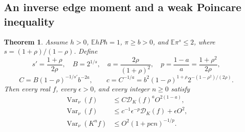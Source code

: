 \documentclass[11pt]{article}
\newcommand{\E}{\mathbb E}
\newtheorem{theorem}{Theorem}[section]
\begin{document}
\subsection{An inverse edge moment and a weak Poincare inequality}
\begin{theorem}\label{weakpoincare}
Assume $h>0$, $\E hPh=1$, $\pi\geq b>0$, and $\E\pi^s\leq2$,
where $s=(1+\rho)/(1-\rho)$. Define
\[
 s'=\frac{1+\rho}{2\rho},\quad B=2^{1/s},\quad
 a=\frac{2\rho}{(1+\rho)^2},\quad
 p=\frac{1-a}{a}=\frac{1+\rho^2}{2\rho},
\]
\[
 C=B(1-\rho)^{-1/s'}b^{-2a},\qquad
 c=C^{-1/a}
   =b^2(1-\rho)^{1+\rho}2^{-(1-\rho^2)/(2\rho)}.
\]
Then every real $f$, every $\epsilon>0$, and every integer $n\geq0$
satisfy
\begin{align}
 \operatorname{Var}_\nu(f)
 &\leq C\mathcal D_K(f)^a O^{2(1-a)},\label{weakenergy}\\
 \operatorname{Var}_\nu(f)
 &\leq c^{-1}\epsilon^{-p}\mathcal D_K(f)+\epsilon O^2,
       \label{weakform}\\
 \operatorname{Var}_\nu(K^n f)
 &\leq O^2(1+pcn)^{-1/p}.\label{weakdecay}
\end{align}
\end{theorem}
\end{document}
